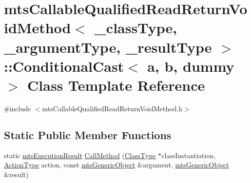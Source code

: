 \hypertarget{classmts_callable_qualified_read_return_void_method_1_1_conditional_cast}{\section{mts\-Callable\-Qualified\-Read\-Return\-Void\-Method$<$ \-\_\-class\-Type, \-\_\-argument\-Type, \-\_\-result\-Type $>$\-:\-:Conditional\-Cast$<$ a, b, dummy $>$ Class Template Reference}
\label{classmts_callable_qualified_read_return_void_method_1_1_conditional_cast}
}


{\ttfamily \#include $<$mts\-Callable\-Qualified\-Read\-Return\-Void\-Method.\-h$>$}

\subsection*{Static Public Member Functions}
\begin{DoxyCompactItemize}
\item 
static \hyperlink{classmts_execution_result}{mts\-Execution\-Result} \hyperlink{classmts_callable_qualified_read_return_void_method_1_1_conditional_cast_ae109ca9f6c5605e6e09fd6c3b02f13e6}{Call\-Method} (\hyperlink{classmts_callable_qualified_read_return_void_method_ae99cfab8208eb374f2cdf01c97edfa3b}{Class\-Type} $\ast$class\-Instantiation, \hyperlink{classmts_callable_qualified_read_return_void_method_a7ac7450d5dce9ad80db720a370118211}{Action\-Type} action, const \hyperlink{classmts_generic_object}{mts\-Generic\-Object} \&argument, \hyperlink{classmts_generic_object}{mts\-Generic\-Object} \&result)
\end{DoxyCompactItemize}



